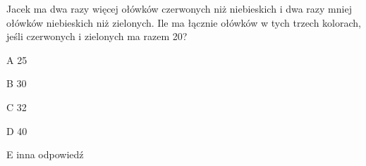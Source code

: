 \begin{tresc}
Jacek ma dwa razy więcej ołówków czerwonych niż niebieskich i dwa razy mniej ołówków niebieskich niż zielonych. Ile ma łącznie ołówków w tych trzech kolorach, jeśli czerwonych i zielonych ma razem 20?
\end{tresc}
\begin{wariant}{A} 25 \end{wariant}
\begin{wariant}{B} 30 \end{wariant}
\begin{wariant}{C} 32 \end{wariant}
\begin{wariant}{D} 40 \end{wariant}
\begin{wariant}{E} inna odpowiedź \end{wariant}
